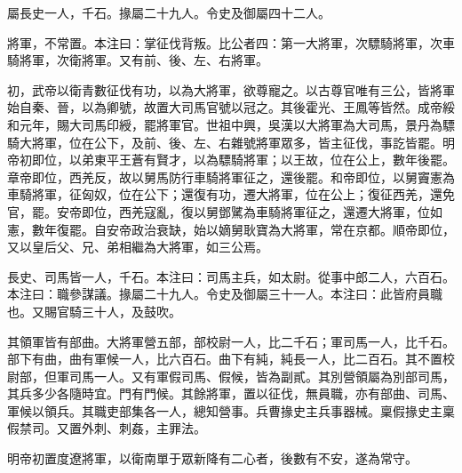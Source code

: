 \begin{pinyinscope}
屬長史一人，千石。掾屬二十九人。令史及御屬四十二人。

將軍，不常置。本注曰：掌征伐背叛。比公者四：第一大將軍，次驃騎將軍，次車騎將軍，次衛將軍。又有前、後、左、右將軍。

初，武帝以衛青數征伐有功，以為大將軍，欲尊寵之。以古尊官唯有三公，皆將軍始自秦、晉，以為卿號，故置大司馬官號以冠之。其後霍光、王鳳等皆然。成帝綏和元年，賜大司馬印綬，罷將軍官。世祖中興，吳漢以大將軍為大司馬，景丹為驃騎大將軍，位在公下，及前、後、左、右雜號將軍眾多，皆主征伐，事訖皆罷。明帝初即位，以弟東平王蒼有賢才，以為驃騎將軍；以王故，位在公上，數年後罷。章帝即位，西羌反，故以舅馬防行車騎將軍征之，還後罷。和帝即位，以舅竇憲為車騎將軍，征匈奴，位在公下；還復有功，遷大將軍，位在公上；復征西羌，還免官，罷。安帝即位，西羌寇亂，復以舅鄧騭為車騎將軍征之，還遷大將軍，位如憲，數年復罷。自安帝政治衰缺，始以嫡舅耿寶為大將軍，常在京都。順帝即位，又以皇后父、兄、弟相繼為大將軍，如三公焉。

長史、司馬皆一人，千石。本注曰：司馬主兵，如太尉。從事中郎二人，六百石。本注曰：職參謀議。掾屬二十九人。令史及御屬三十一人。本注曰：此皆府員職也。又賜官騎三十人，及鼓吹。

其領軍皆有部曲。大將軍營五部，部校尉一人，比二千石；軍司馬一人，比千石。部下有曲，曲有軍候一人，比六百石。曲下有純，純長一人，比二百石。其不置校尉部，但軍司馬一人。又有軍假司馬、假候，皆為副貳。其別營領屬為別部司馬，其兵多少各隨時宜。門有門候。其餘將軍，置以征伐，無員職，亦有部曲、司馬、軍候以領兵。其職吏部集各一人，總知營事。兵曹掾史主兵事器械。稟假掾史主稟假禁司。又置外刺、刺姦，主罪法。

明帝初置度遼將軍，以衛南單于眾新降有二心者，後數有不安，遂為常守。


\end{pinyinscope}